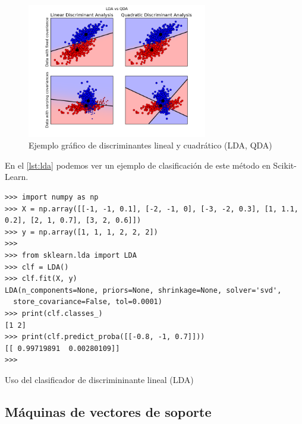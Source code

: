 \begin{figure}[htbp]
\centering
\includegraphics[width=0.7\textwidth]{plot_lda_qda_0011}
\caption[Ejemplo gráfico de discriminantes lineal y cuadrático (LDA, QDA)]{Ejemplo gráfico de discriminantes lineal y cuadrático (LDA, QDA) \citep{Pedregosa2011}}
\label{fig:lda-qda}
\end{figure}

En el \autoref{lst:lda} podemos ver un ejemplo de clasificación de este método en Scikit-Learn.

\begin{listing}[htbp]
\begin{verbatim}
>>> import numpy as np
>>> X = np.array([[-1, -1, 0.1], [-2, -1, 0], [-3, -2, 0.3], [1, 1.1, 0.2], [2, 1, 0.7], [3, 2, 0.6]])
>>> y = np.array([1, 1, 1, 2, 2, 2])
>>> 
>>> from sklearn.lda import LDA
>>> clf = LDA()
>>> clf.fit(X, y)
LDA(n_components=None, priors=None, shrinkage=None, solver='svd',
  store_covariance=False, tol=0.0001)
>>> print(clf.classes_)
[1 2]
>>> print(clf.predict_proba([[-0.8, -1, 0.7]]))
[[ 0.99719891  0.00280109]]
>>> 
\end{verbatim}
\caption{Uso del clasificador de discrimininante lineal (LDA)}
\label{lst:lda}
\end{listing}


\subsection{Máquinas de vectores de soporte}

